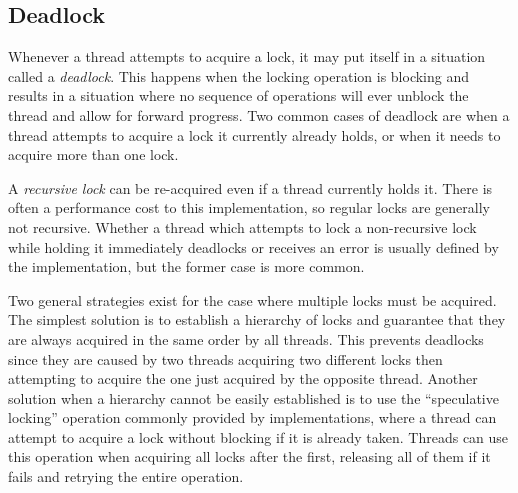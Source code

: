\subsection{Deadlock}

Whenever a thread attempts to acquire a lock, it may put itself in a situation
called a \textit{deadlock}.  This happens when the locking operation is blocking
and results in a situation where no sequence of operations will ever unblock the
thread and allow for forward progress.  Two common cases of deadlock are when a
thread attempts to acquire a lock it currently already holds, or when it needs
to acquire more than one lock.

A \textit{recursive lock} can be re-acquired even if a thread currently holds
it.  There is often a performance cost to this implementation, so regular locks
are generally not recursive.  Whether a thread which attempts to lock a
non-recursive lock while holding it immediately deadlocks or receives an error
is usually defined by the implementation, but the former case is more common.

Two general strategies exist for the case where multiple locks must be acquired.
The simplest solution is to establish a hierarchy of locks and guarantee that
they are always acquired in the same order by all threads.  This prevents
deadlocks since they are caused by two threads acquiring two different locks
then attempting to acquire the one just acquired by the opposite thread.
Another solution when a hierarchy cannot be easily established is to use the
``speculative locking'' operation commonly provided by implementations, where a
thread can attempt to acquire a lock without blocking if it is already taken.
Threads can use this operation when acquiring all locks after the first,
releasing all of them if it fails and retrying the entire operation.
